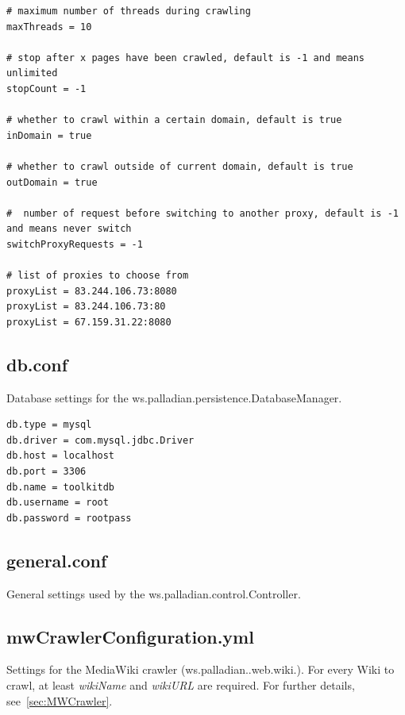 \documentclass[a4paper,twoside]{book}      %
\begin{document}
\begin{verbatim}
# maximum number of threads during crawling
maxThreads = 10

# stop after x pages have been crawled, default is -1 and means unlimited
stopCount = -1

# whether to crawl within a certain domain, default is true
inDomain = true
	
# whether to crawl outside of current domain, default is true
outDomain = true

#  number of request before switching to another proxy, default is -1 and means never switch
switchProxyRequests = -1
	
# list of proxies to choose from
proxyList = 83.244.106.73:8080
proxyList = 83.244.106.73:80
proxyList = 67.159.31.22:8080
\end{verbatim}

\subsection{db.conf}
Database settings for the ws.palladian.persistence.DatabaseManager.

\begin{verbatim}
db.type = mysql
db.driver = com.mysql.jdbc.Driver
db.host = localhost
db.port = 3306
db.name = toolkitdb
db.username = root
db.password = rootpass
\end{verbatim}

\subsection{general.conf}
General settings used by the ws.palladian.control.Controller.


\subsection{mwCrawlerConfiguration.yml}

Settings for the MediaWiki crawler (ws.palladian..web.wiki.). For every Wiki to crawl, at least \emph{wikiName} and \emph{wikiURL} are required. For further details, see~\ref{sec:MWCrawler}.
\end{document}

